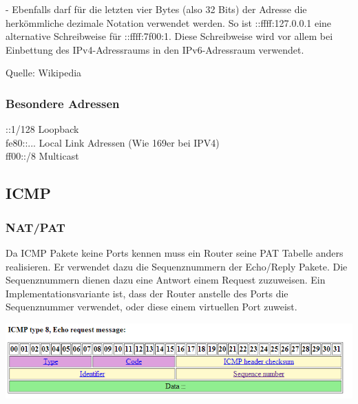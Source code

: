 - Ebenfalls darf für die letzten vier Bytes (also 32 Bits) der Adresse die herkömmliche dezimale Notation verwendet werden. So ist ::ffff:127.0.0.1 eine alternative Schreibweise für ::ffff:7f00:1. Diese Schreibweise wird vor allem bei Einbettung des IPv4-Adressraums in den IPv6-Adressraum verwendet.

Quelle: Wikipedia

\subsubsection{Besondere Adressen}
::1/128 Loopback\\
fe80::... Local Link Adressen (Wie 169er bei IPV4)\\
ff00::/8 Multicast


\subsection{ICMP}

\subsubsection{NAT/PAT}
Da ICMP Pakete keine Ports kennen muss ein Router seine PAT Tabelle anders realisieren.
Er verwendet dazu die Sequenznummern der Echo/Reply Pakete. Die Sequenznummern dienen dazu eine Antwort einem Request zuzuweisen. Ein Implementationsvariante ist, dass der Router anstelle des Ports die Sequenznummer verwendet, oder diese einem virtuellen Port zuweist.

\includegraphics[scale=0.8]{media/ICMPRequest.png}

